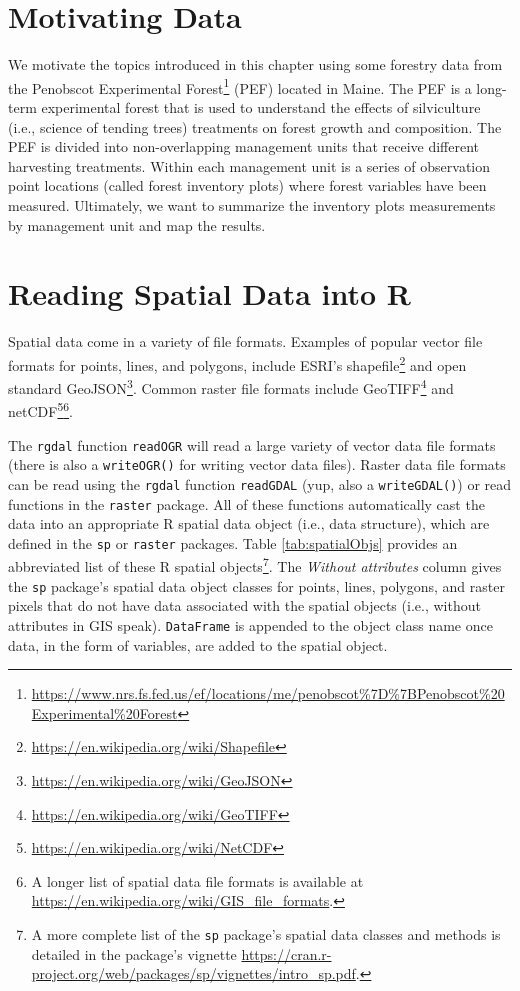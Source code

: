 \documentclass[]{krantz}
\renewcommand{\href}[2]{#2\footnote{\url{#1}}}
\begin{document}
\section{Motivating Data}\label{motivating-data}

We motivate the topics introduced in this chapter using some forestry
data from the
\href{https://www.nrs.fs.fed.us/ef/locations/me/penobscot\%7D\%7BPenobscot\%20Experimental\%20Forest}{Penobscot
Experimental Forest} (PEF) located in Maine. The PEF is a long-term
experimental forest that is used to understand the effects of
silviculture (i.e., science of tending trees) treatments on forest
growth and composition. The PEF is divided into non-overlapping
management units that receive different harvesting treatments. Within
each management unit is a series of observation point locations (called
forest inventory plots) where forest variables have been measured.
Ultimately, we want to summarize the inventory plots measurements by
management unit and map the results.

\section{Reading Spatial Data into R}\label{reading-spatial-data-into-r}

Spatial data come in a variety of file formats. Examples of popular
vector file formats for points, lines, and polygons, include ESRI's
\href{https://en.wikipedia.org/wiki/Shapefile}{shapefile} and open
standard \href{https://en.wikipedia.org/wiki/GeoJSON}{GeoJSON}. Common
raster file formats include
\href{https://en.wikipedia.org/wiki/GeoTIFF}{GeoTIFF} and
\href{https://en.wikipedia.org/wiki/NetCDF}{netCDF}\footnote{A longer
  list of spatial data file formats is available at
  \url{https://en.wikipedia.org/wiki/GIS_file_formats}.}.

The \texttt{rgdal} function \texttt{readOGR} will read a large variety
of vector data file formats (there is also a \texttt{writeOGR()} for
writing vector data files). Raster data file formats can be read using
the \texttt{rgdal} function \texttt{readGDAL} (yup, also a
\texttt{writeGDAL()}) or read functions in the \texttt{raster} package.
All of these functions automatically cast the data into an appropriate R
spatial data object (i.e., data structure), which are defined in the
\texttt{sp} or \texttt{raster} packages. Table \ref{tab:spatialObjs}
provides an abbreviated list of these R spatial objects\footnote{A more
  complete list of the \texttt{sp} package's spatial data classes and
  methods is detailed in the package's vignette
  \url{https://cran.r-project.org/web/packages/sp/vignettes/intro_sp.pdf}.}.
The \emph{Without attributes }column gives the \texttt{sp} package's
spatial data object classes for points, lines, polygons, and raster
pixels that do not have data associated with the spatial objects (i.e.,
without attributes in GIS speak). \texttt{DataFrame} is appended to the
object class name once data, in the form of variables, are added to the
spatial object.
\end{document}
